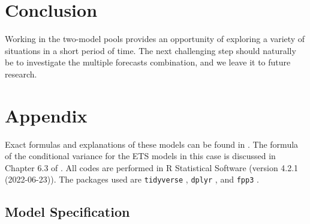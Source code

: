 \documentclass{monashthesis}
\begin{document}
\begin{table}[ht]
  \centering
  \caption{Updated Research Plan}
\end{table}

\hypertarget{conclusion}{%
\chapter{Conclusion}\label{conclusion}}

Working in the two-model pools provides an opportunity of exploring a variety of situations in a short period of time. The next challenging step should naturally be to investigate the multiple forecasts combination, and we leave it to future research.

\appendix

\hypertarget{appendix}{%
\chapter{Appendix}\label{appendix}}

Exact formulas and explanations of these models can be found in \textcite{fpp3}. The formula of the conditional variance for the ETS models in this case is discussed in Chapter 6.3 of \textcite{HKOS08}. All codes are performed in R Statistical Software (version 4.2.1 (2022-06-23)). The packages used are \texttt{tidyverse} \autocite{tidy19}, \texttt{dplyr} \autocite{dplyr23}, and \texttt{fpp3} \autocite{fpp23}.

\hypertarget{model-specification}{%
\section{Model Specification}\label{model-specification}}
\end{document}
